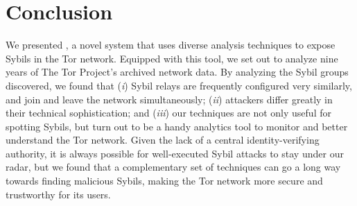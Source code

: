 \section{Conclusion}
\label{sec:conclusion}
We presented \sys, a novel system that uses diverse analysis techniques to
expose Sybils in the Tor network.  Equipped with this tool, we set out to
analyze nine years of The Tor Project's archived network data.  By analyzing the
Sybil groups \sys discovered, we found that (\emph{i}) Sybil relays are
frequently configured very similarly, and join and leave the network
simultaneously; (\emph{ii}) attackers differ greatly in their technical
sophistication; and (\emph{iii}) our techniques are not only useful for spotting
Sybils, but turn out to be a handy analytics tool to monitor and better
understand the Tor network.  Given the lack of a central identity-verifying
authority, it is always possible for well-executed Sybil attacks to stay under
our radar, but we found that a complementary set of techniques can go a long way
towards finding malicious Sybils, making the Tor network more secure and
trustworthy for its users.

